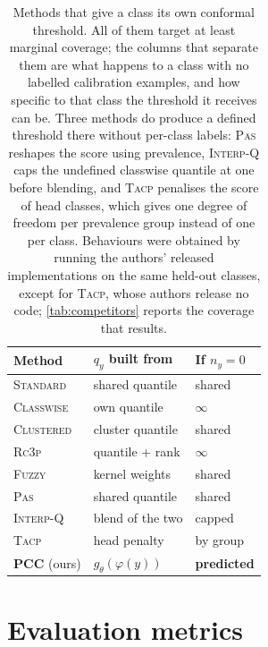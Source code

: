 \begin{table}[h]
\centering
\small
\setlength{\tabcolsep}{3pt}
\begin{tabular}{@{}lll@{}}
\toprule
Method & $q_y$ built from & If $n_y=0$ \\
\midrule
\textsc{Standard} \cite{vovk2005algorithmic}  & shared quantile   & shared \\
\textsc{Classwise} \cite{sadinle2019least}    & own quantile      & $\infty$ \\
\textsc{Clustered} \cite{ding2023class}       & cluster quantile  & shared \\
\textsc{Rc3p} \cite{shi2024rank}              & quantile + rank   & $\infty$ \\
\textsc{Fuzzy} \cite{ding2026conformal}       & kernel weights    & shared \\
\textsc{Pas} \cite{ding2026conformal}         & shared quantile   & shared \\
\textsc{Interp-Q} \cite{ding2026conformal}    & blend of the two  & capped \\
\textsc{Tacp} \cite{liu2026tail}              & head penalty      & by group \\
\midrule
\textbf{PCC} (ours) & $g_\theta(\varphi(y))$ & \textbf{predicted} \\
\bottomrule
\end{tabular}
\caption{Methods that give a class its own conformal threshold. All of them target at least
marginal coverage; the columns that separate them are what happens to a class with no labelled
calibration examples, and how specific to that class the threshold it receives can be. Three
methods do produce a defined threshold there without per-class labels: \textsc{Pas} reshapes the
score using prevalence, \textsc{Interp-Q} caps the undefined classwise quantile at one before
blending, and \textsc{Tacp} penalises the score of head classes, which gives one degree of
freedom per prevalence group instead of one per class. Behaviours were obtained by running the
authors' released implementations on the same held-out classes, except for \textsc{Tacp}, whose
authors release no code; \cref{tab:competitors} reports the coverage that results.}
\label{tab:methods}
\end{table}

\section{Evaluation metrics}
\label{app:metrics}

